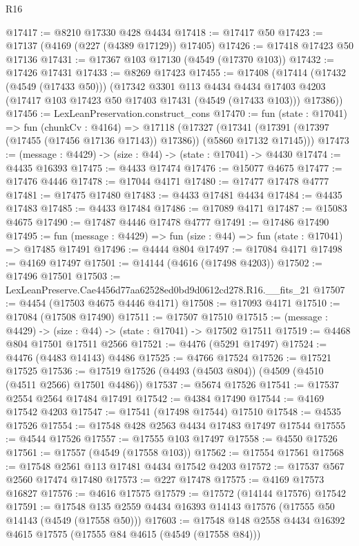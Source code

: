 \begin{lexlean}{R16}
\begin{coremodule}
@17417 := @8210 @17330 @428 @4434
@17418 := @17417 @50
@17423 := @17137 (@4169 (@227 (@4389 @17129)) @17405)
@17426 := @17418 @17423 @50 @17136
@17431 := @17367 @103 @17130 (@4549 (@17370 @103))
@17432 := @17426 @17431
@17433 := @8269 @17423
@17455 := @17408
    (@17414
      (@17432 (@4549 (@17433 @50)))
      (@17342
        @3301
        @113
        @4434
        @4434
        @17403
        @4203
        (@17417 @103 @17423 @50 @17403 @17431 (@4549 (@17433 @103)))
        @17386))
@17456 := LexLeanPreservation.construct_cons
@17470 := fun (state : @17041) =>
  fun (chunkCv : @4164) =>
  @17118
    (@17327 (@17341 (@17391 (@17397 (@17455 (@17456 @17136 @17143)) @17386)) (@5860 @17132 @17145)))
@17473 := (message : @4429) -> (size : @44) -> (state : @17041) -> @4430
@17474 := @4435 @16393
@17475 := @4433 @17474
@17476 := @15077 @4675
@17477 := @17476 @4446
@17478 := @17044 @4171
@17480 := @17477 @17478 @4777
@17481 := @17475 @17480
@17483 := @4433 @17481 @4434
@17484 := @4435 @17483
@17485 := @4433 @17484
@17486 := @17089 @4171
@17487 := @15083 @4675
@17490 := @17487 @4446 @17478 @4777
@17491 := @17486 @17490
@17495 := fun (message : @4429) => fun (size : @44) => fun (state : @17041) => @17485 @17491
@17496 := @4444 @804
@17497 := @17084 @4171
@17498 := @4169 @17497
@17501 := @14144 (@4616 (@17498 @4203))
@17502 := @17496 @17501
@17503 := LexLeanPreserve.Cae4456d77aa62528ed0bd9d0612cd278.R16.__fits_21
@17507 := @4454 (@17503 @4675 @4446 @4171)
@17508 := @17093 @4171
@17510 := @17084 (@17508 @17490)
@17511 := @17507 @17510
@17515 := (message : @4429) -> (size : @44) -> (state : @17041) -> @17502 @17511
@17519 := @4468 @804 @17501 @17511 @2566
@17521 := @4476 (@5291 @17497)
@17524 := @4476 (@4483 @14143) @4486
@17525 := @4766 @17524
@17526 := @17521 @17525
@17536 := @17519 @17526 (@4493 (@4503 @804)) (@4509 (@4510 (@4511 @2566) @17501 @4486))
@17537 := @5674 @17526
@17541 := @17537 @2554 @2564 @17484 @17491
@17542 := @4384 @17490
@17544 := @4169 @17542 @4203
@17547 := @17541 (@17498 @17544) @17510
@17548 := @4535 @17526
@17554 := @17548 @428 @2563 @4434 @17483 @17497 @17544
@17555 := @4544 @17526
@17557 := @17555 @103 @17497
@17558 := @4550 @17526
@17561 := @17557 (@4549 (@17558 @103))
@17562 := @17554 @17561
@17568 := @17548 @2561 @113 @17481 @4434 @17542 @4203
@17572 := @17537 @567 @2560 @17474 @17480
@17573 := @227 @17478
@17575 := @4169 @17573 @16827
@17576 := @4616 @17575
@17579 := @17572 (@14144 @17576) @17542
@17591 := @17548 @135 @2559 @4434 @16393 @14143 @17576 (@17555 @50 @14143 (@4549 (@17558 @50)))
@17603 := @17548 @148 @2558 @4434 @16392 @4615 @17575 (@17555 @84 @4615 (@4549 (@17558 @84)))

\end{coremodule}
\end{lexlean}
